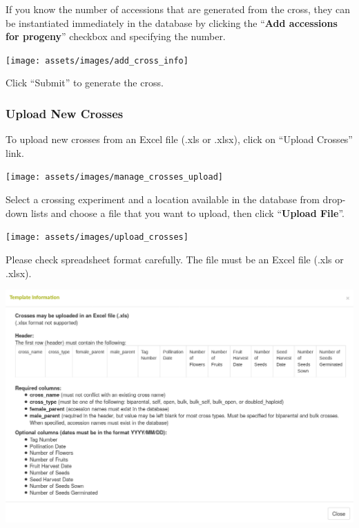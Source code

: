 \documentclass[
  12pt,
]{book}
\begin{document}
If you know the number of accessions that are generated from the cross, they can be instantiated immediately in the database by clicking the ``\textbf{Add accessions for progeny}'' checkbox and specifying the number.

\begin{center}\texttt{[image: assets/images/add\_cross\_info]} \end{center}

Click ``Submit'' to generate the cross.

\hypertarget{upload-new-crosses}{%
\subsubsection*{Upload New Crosses}\label{upload-new-crosses}}


To upload new crosses from an Excel file (.xls or .xlsx), click on ``Upload Crosses'' link.

\begin{center}\texttt{[image: assets/images/manage\_crosses\_upload]} \end{center}

Select a crossing experiment and a location available in the database from drop-down lists and choose a file that you want to upload, then click ``\textbf{Upload File}''.

\begin{center}\texttt{[image: assets/images/upload\_crosses]} \end{center}

Please check spreadsheet format carefully. The file must be an Excel file (.xls or .xlsx).

\begin{center}\includegraphics[width=0.95\linewidth]{assets/images/cross_upload_format} \end{center}
\end{document}
